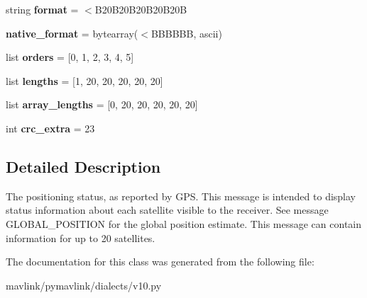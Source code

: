 \begin{DoxyCompactItemize}
string {\bfseries format} = \textquotesingle{}$<$B20\+B20\+B20\+B20\+B20B\textquotesingle{}
\item 
\mbox{\label{classpymavlink_1_1dialects_1_1v10_1_1MAVLink__gps__status__message_a4d7b3913a1ce2ceb67630d8abbd13684}} 
{\bfseries native\+\_\+format} = bytearray(\textquotesingle{}$<$B\+B\+B\+B\+BB\textquotesingle{}, \textquotesingle{}ascii\textquotesingle{})
\item 
\mbox{\label{classpymavlink_1_1dialects_1_1v10_1_1MAVLink__gps__status__message_a30631a37c0b5314e5a0e7bb581933325}} 
list {\bfseries orders} = \mbox{[}0, 1, 2, 3, 4, 5\mbox{]}
\item 
\mbox{\label{classpymavlink_1_1dialects_1_1v10_1_1MAVLink__gps__status__message_a3145d6d79b0ae33345a58c0413ae6589}} 
list {\bfseries lengths} = \mbox{[}1, 20, 20, 20, 20, 20\mbox{]}
\item 
\mbox{\label{classpymavlink_1_1dialects_1_1v10_1_1MAVLink__gps__status__message_ad63ce7d9da4330e365e8139cb5e8e10c}} 
list {\bfseries array\+\_\+lengths} = \mbox{[}0, 20, 20, 20, 20, 20\mbox{]}
\item 
\mbox{\label{classpymavlink_1_1dialects_1_1v10_1_1MAVLink__gps__status__message_a0e57d800057c8d3e9559ded25f2c1482}} 
int {\bfseries crc\+\_\+extra} = 23
\end{DoxyCompactItemize}


\subsection{Detailed Description}
\begin{DoxyVerb}The positioning status, as reported by GPS. This message is
intended to display status information about each satellite
visible to the receiver. See message GLOBAL_POSITION for the
global position estimate. This message can contain information
for up to 20 satellites.
\end{DoxyVerb}
 

The documentation for this class was generated from the following file\+:\begin{DoxyCompactItemize}
\item 
mavlink/pymavlink/dialects/v10.\+py\end{DoxyCompactItemize}

